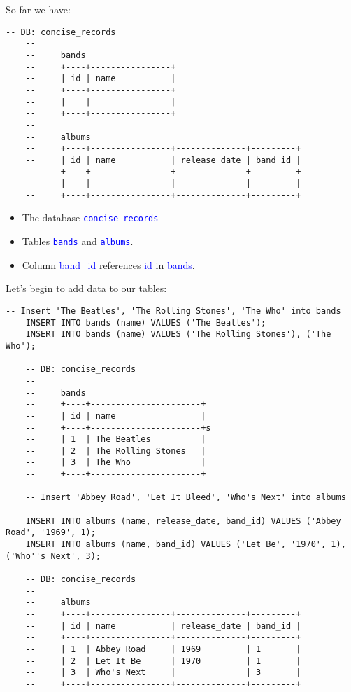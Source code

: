 \noindent
So far we have:
\begin{lstlisting}[style=sql]
    -- DB: concise_records
    --
    --     bands
    --     +----+----------------+
    --     | id | name           |
    --     +----+----------------+
    --     |    |                |
    --     +----+----------------+
    --
    --     albums
    --     +----+----------------+--------------+---------+
    --     | id | name           | release_date | band_id |
    --     +----+----------------+--------------+---------+
    --     |    |                |              |         |
    --     +----+----------------+--------------+---------+
\end{lstlisting}

\noindent
\begin{itemize}
    \item The database \textcolor{blue}{\texttt{concise\_records}}
    \item Tables \textcolor{blue}{\texttt{bands}} and \textcolor{blue}{\texttt{albums}}.
    \item Column \textcolor{blue}{band\_id} references \textcolor{blue}{id} in \textcolor{blue}{bands}.
\end{itemize}

\newpage

\noindent
Let's begin to add data to our tables:

\begin{lstlisting}[style=sql]
    -- Insert 'The Beatles', 'The Rolling Stones', 'The Who' into bands
    INSERT INTO bands (name) VALUES ('The Beatles');
    INSERT INTO bands (name) VALUES ('The Rolling Stones'), ('The Who');

    -- DB: concise_records
    --
    --     bands
    --     +----+----------------------+
    --     | id | name                 |
    --     +----+----------------------+s
    --     | 1  | The Beatles          |
    --     | 2  | The Rolling Stones   |
    --     | 3  | The Who              |
    --     +----+----------------------+

    -- Insert 'Abbey Road', 'Let It Bleed', 'Who's Next' into albums

    INSERT INTO albums (name, release_date, band_id) VALUES ('Abbey Road', '1969', 1);
    INSERT INTO albums (name, band_id) VALUES ('Let Be', '1970', 1), ('Who''s Next', 3);

    -- DB: concise_records
    --
    --     albums
    --     +----+----------------+--------------+---------+
    --     | id | name           | release_date | band_id |
    --     +----+----------------+--------------+---------+
    --     | 1  | Abbey Road     | 1969         | 1       |
    --     | 2  | Let It Be      | 1970         | 1       |
    --     | 3  | Who's Next     |              | 3       |
    --     +----+----------------+--------------+---------+

\end{lstlisting}


